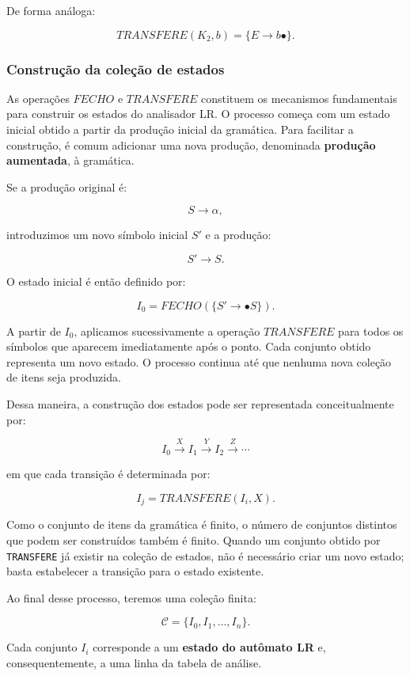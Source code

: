 \documentclass[
  brazilian,
  letterpaper,
]{book}
\theoremstyle{plain}
\theoremstyle{definition}
\theoremstyle{remark}
\begin{document}
De forma análoga:

\[
TRANSFERE(K_2,b)=\{E\rightarrow b\bullet\}.
\]

\subsubsection{Construção da coleção de
estados}\label{construuxe7uxe3o-da-coleuxe7uxe3o-de-estados}

As operações \(FECHO\) e \(TRANSFERE\) constituem os mecanismos
fundamentais para construir os estados do analisador LR. O processo
começa com um estado inicial obtido a partir da produção inicial da
gramática. Para facilitar a construção, é comum adicionar uma nova
produção, denominada \textbf{produção aumentada}, à gramática.

Se a produção original é:

\[
S\rightarrow\alpha,
\]

introduzimos um novo símbolo inicial \(S'\) e a produção:

\[
S'\rightarrow S.
\]

O estado inicial é então definido por:

\[
I_0=FECHO(\{S'\rightarrow\bullet S\}).
\]

A partir de \(I_0\), aplicamos sucessivamente a operação \(TRANSFERE\)
para todos os símbolos que aparecem imediatamente após o ponto. Cada
conjunto obtido representa um novo estado. O processo continua até que
nenhuma nova coleção de itens seja produzida.

Dessa maneira, a construção dos estados pode ser representada
conceitualmente por:

\[
I_0
\overset{X}{\longrightarrow}
I_1
\overset{Y}{\longrightarrow}
I_2
\overset{Z}{\longrightarrow}
\cdots
\]

em que cada transição é determinada por:

\[
I_j=TRANSFERE(I_i,X).
\]

Como o conjunto de itens da gramática é finito, o número de conjuntos
distintos que podem ser construídos também é finito. Quando um conjunto
obtido por \texttt{TRANSFERE} já existir na coleção de estados, não é
necessário criar um novo estado; basta estabelecer a transição para o
estado existente.

Ao final desse processo, teremos uma coleção finita:

\[
\mathcal{C}=\{I_0,I_1,\ldots,I_n\}.
\]

Cada conjunto \(I_i\) corresponde a um \textbf{estado do autômato LR} e,
consequentemente, a uma linha da tabela de análise.
\end{document}
